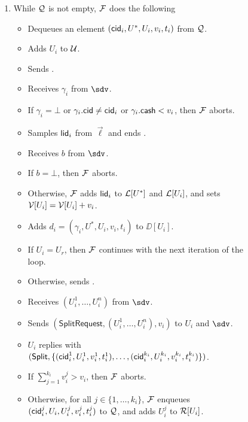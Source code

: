 \begin{figure*}[!t]
{{\begin{enumerate}
	\item While $\mathcal{Q}$ is not empty, $\mathcal{F}$ does the following
	\begin{itemize}[label=-]
		\item Dequeues an element $(\mathsf{cid}_i,U^*,U_i,v_i,t_i)$ from $\mathcal{Q}$.
		\item Adds $U_i$ to $\mathcal{U}$.
		\item Sends .
		\item Receives $\gamma_i$ from $\sdv$.
		\item If $\gamma_i = \bot$ or $\gamma_i.\mathsf{cid} \neq \mathsf{cid}_i$ or $\gamma_i.\mathsf{cash} < v_i$, 
		then $\mathcal{F}$ aborts.
		\item Samples $\mathsf{lid}_i$ from $\vec{\ell}$ and ends .
		\item Receives $b$ from $\sdv$.
		\item If $b = \bot$, then $\mathcal{F}$ aborts.
		\item Otherwise, $\mathcal{F}$ adds $\mathsf{lid}_i$ to $\mathcal{L}[U^*]$ and $\mathcal{L}[U_i]$, and sets $\mathcal{V}[U_i] = 
		\mathcal{V}[U_i] + v_i$.
		\item Adds $d_i = (\gamma_i,U^*,U_i,v_i,t_i)$ to $\DD[U_i]$.
		\item If $U_i = U_r$, then $\mathcal{F}$ continues with the next iteration of the loop.
		\item Otherwise, sends .
		\item Receives $(U_i^1,\ldots,U_i^n)$ from $\sdv$.
		\item Sends $(\mathsf{SplitRequest}, (U_i^1,\ldots,U_i^n), v_i)$ to $U_i$ 
		and $\sdv$.
		\item $U_i$ replies with $(\mathsf{Split}, \{(\mathsf{cid}_i^1,U_i^1,v_i^1,t_i^1),\ldots,
		(\mathsf{cid}_i^{k_i},U_i^{k_i},v_i^{k_i},t_i^{k_i})\})$.
		\item If $\textstyle\sum_{j = 1}^{k_i} v_i^j > v_i$, then $\mathcal{F}$ aborts.
		\item Otherwise, for all $j \in \{1,\ldots,k_i\}$, $\mathcal{F}$ enqueues 
		$(\mathsf{cid}_i^j,U_i,U_i^j,v_i^j,t_i^j)$ to $\mathcal{Q}$, and adds $U_i^j$ to $\mathcal{R}[U_i]$.
	\end{itemize}
	

\end{enumerate}}}
\end{figure*}
